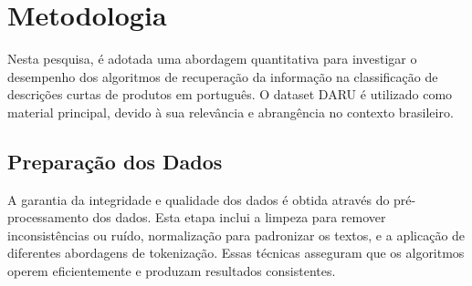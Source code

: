 



\section{Metodologia}

Nesta pesquisa, é adotada uma abordagem quantitativa para investigar o desempenho dos algoritmos de recuperação da informação na classificação de descrições curtas de produtos em português. O dataset DARU é utilizado como material principal, devido à sua relevância e abrangência no contexto brasileiro.

\subsection{Preparação dos Dados}
A garantia da integridade e qualidade dos dados é obtida através do pré-processamento dos dados. Esta etapa inclui a limpeza para remover inconsistências ou ruído, normalização para padronizar os textos, e a aplicação de diferentes abordagens de tokenização. Essas técnicas asseguram que os algoritmos operem eficientemente e produzam resultados consistentes.


